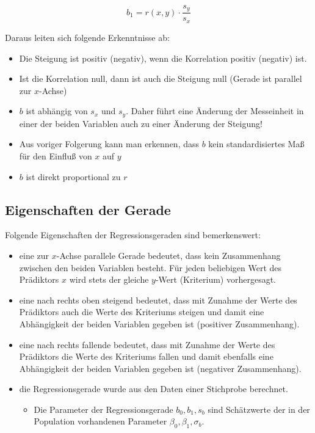 \documentclass[
]{article}
\providecommand{\tightlist}{%
  \setlength{\itemsep}{0pt}\setlength{\parskip}{0pt}}
\begin{document}
\[b_1 = r(x,y) \cdot \frac{s_y}{s_x}\]

Daraus leiten sich folgende Erkenntnisse ab:

\begin{itemize}
\tightlist
\item
  Die Steigung ist positiv (negativ), wenn die Korrelation positiv (negativ) ist.
\item
  Ist die Korrelation null, dann ist auch die Steigung null (Gerade ist parallel zur \(x\)-Achse)
\item
  \(b\) ist abhängig von \(s_x\) und \(s_y\). Daher führt eine Änderung der Messeinheit in einer der beiden Variablen auch zu einer Änderung der Steigung!
\item
  Aus voriger Folgerung kann man erkennen, dass \(b\) kein standardisiertes Maß für den Einfluß von \(x\) auf \(y\)
\item
  \(b\) ist direkt proportional zu \(r\)
\end{itemize}

\subsection*{Eigenschaften der Gerade}\label{eigenschaften-der-gerade}

Folgende Eigenschaften der Regressionsgeraden sind bemerkenswert:

\begin{itemize}
\tightlist
\item
  eine zur \(x\)-Achse parallele Gerade bedeutet, dass kein Zusammenhang zwischen den beiden Variablen besteht. Für jeden beliebigen Wert des Prädiktors \(x\) wird stets der gleiche \(y\)-Wert (Kriterium) vorhergesagt.
\item
  eine nach rechts oben steigend bedeutet, dass mit Zunahme der Werte des Prädiktors auch die Werte des Kriteriums steigen und damit eine Abhängigkeit der beiden Variablen gegeben ist (positiver Zusammenhang).
\item
  eine nach rechts fallende bedeutet, dass mit Zunahme der Werte des Prädiktors die Werte des Kriteriums fallen und damit ebenfalls eine Abhängigkeit der beiden Variablen gegeben ist (negativer Zusammenhang).
\item
  die Regressionsgerade wurde aus den Daten einer Stichprobe berechnet.

  \begin{itemize}
  \tightlist
  \item
    Die Parameter der Regressionsgerade \(b_0, b_1, s_b\) sind Schätzwerte der in der Population vorhandenen Parameter \(\beta_0, \beta_1, \sigma_b\).
  \end{itemize}
\end{itemize}
\end{document}
